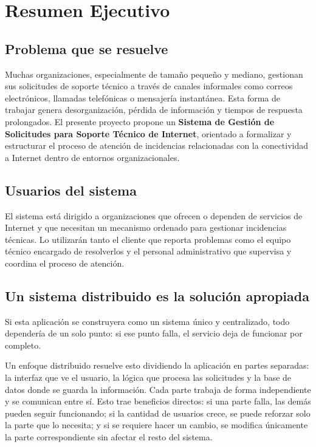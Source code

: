 \documentclass[12pt, a4paper]{article}
\begin{document}
\newpage
\onehalfspacing

\section{Resumen Ejecutivo}

\subsection{Problema que se resuelve}

Muchas organizaciones, especialmente de tamaño pequeño y mediano, gestionan
sus solicitudes de soporte técnico a través de canales informales como correos
electrónicos, llamadas telefónicas o mensajería instantánea. Esta forma de
trabajar genera desorganización, pérdida de información y tiempos de respuesta
prolongados. El presente proyecto propone un \textbf{Sistema de Gestión de
Solicitudes para Soporte Técnico de Internet}, orientado a formalizar y
estructurar el proceso de atención de incidencias relacionadas con la
conectividad a Internet dentro de entornos organizacionales.

\vspace{0.5cm}

\subsection{Usuarios del sistema}

El sistema está dirigido a organizaciones que ofrecen o dependen de servicios
de Internet y que necesitan un mecanismo ordenado para gestionar incidencias
técnicas. Lo utilizarán tanto el cliente que reporta problemas como el equipo
técnico encargado de resolverlos y el personal administrativo que supervisa y
coordina el proceso de atención.

\vspace{0.5cm}

\subsection{Un sistema distribuido es la solución apropiada}

Si esta aplicación se construyera como un sistema único y centralizado,
todo dependería de un solo punto: si ese punto falla, el servicio deja de
funcionar por completo.

Un enfoque distribuido resuelve esto dividiendo la aplicación en partes
separadas: la interfaz que ve el usuario, la lógica que procesa las
solicitudes y la base de datos donde se guarda la información. Cada parte
trabaja de forma independiente y se comunican entre sí. Esto trae beneficios
directos: si una parte falla, las demás pueden seguir funcionando; si la
cantidad de usuarios crece, se puede reforzar solo la parte que lo necesita;
y si se requiere hacer un cambio, se modifica únicamente la parte
correspondiente sin afectar el resto del sistema.
\end{document}
